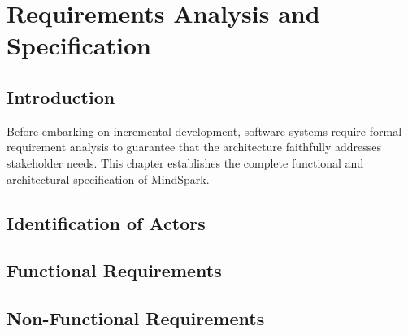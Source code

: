 
\chapter{Requirements Analysis and Specification}
\label{chap:requirements}


\section{Introduction}
\label{sec:ch3_intro}
Before embarking on incremental development, software systems require formal requirement analysis to guarantee that the architecture faithfully addresses stakeholder needs. This chapter establishes the complete functional and architectural specification of MindSpark.

\section{Identification of Actors}
\label{sec:ch3_actors}

\section{Functional Requirements}
\label{sec:ch3_functional_reqs}

\section{Non-Functional Requirements}
\label{sec:ch3_non_functional_reqs}

